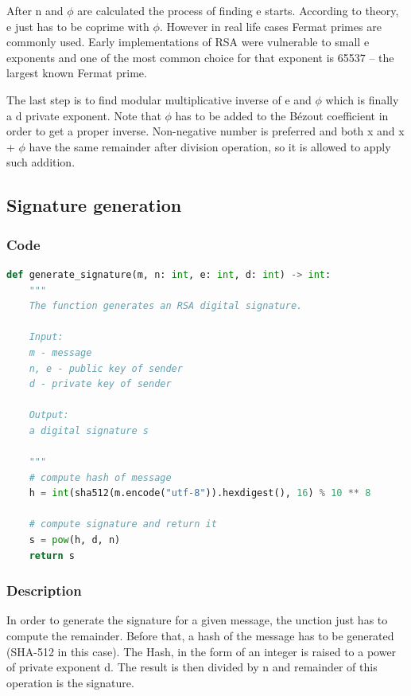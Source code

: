 \documentclass{article}
\begin{document}
After n and $\phi$ are calculated the process of finding e starts. According to theory,
e just has to be coprime with $\phi$. However in real life cases Fermat primes are commonly used. 
Early implementations of RSA were vulnerable to small e exponents and one of the
most common choice for that exponent is 65537 -- the largest known Fermat prime.

The last step is to find modular multiplicative inverse of e and $\phi$ which is finally
a d private exponent. Note that $\phi$ has to be added to the Bézout coefficient in order to get a
proper inverse. Non-negative number is preferred and both x and x + $\phi$ have the same remainder
after division operation, so it is allowed to apply such addition.

\subsection{Signature generation}
\subsubsection{Code}

\small

\begin{lstlisting}[language=Python]
    def generate_signature(m, n: int, e: int, d: int) -> int:
    """
    The function generates an RSA digital signature.

    Input:
    m - message
    n, e - public key of sender
    d - private key of sender

    Output:
    a digital signature s

    """
    # compute hash of message
    h = int(sha512(m.encode("utf-8")).hexdigest(), 16) % 10 ** 8

    # compute signature and return it
    s = pow(h, d, n)
    return s
\end{lstlisting}

\normalsize

\subsubsection{Description}
In order to generate the signature for a given message, the unction just has to compute 
the remainder. Before that, a hash of the message has to be generated (SHA-512 in this case).
The Hash, in the form of an integer is raised to a power of private exponent d. The result is then
divided by n and remainder of this operation is the signature.
\end{document}
